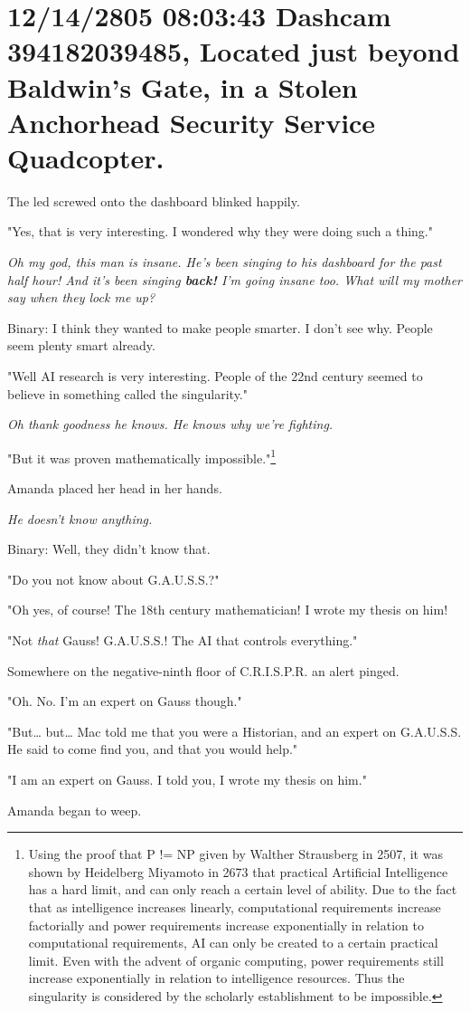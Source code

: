 \documentclass[12pt]{book}
\begin{document}
\section*{12/14/2805 08:03:43 Dashcam 394182039485, Located just beyond Baldwin's Gate, in a Stolen Anchorhead Security Service Quadcopter.}
\label{sec:org665df3d}

The led screwed onto the dashboard blinked happily.

"Yes, that is very interesting. I wondered why they were doing such a thing."

\emph{Oh my god, this man is insane. He's been singing to his dashboard for the past half hour! And it's been singing \textbf{back!} I'm going insane too. What will my mother say when they lock me up?}

Binary: I think they wanted to make people smarter. I don't see why. People seem plenty smart already.

"Well AI research is very interesting. People of the 22nd century seemed to believe in something called the singularity."

\emph{Oh thank goodness he knows. He knows why we're fighting.}

"But it was proven mathematically impossible."\footnote{Using the proof that P != NP given by Walther Strausberg in 2507, it was shown by Heidelberg Miyamoto in 2673 that practical Artificial Intelligence has a hard limit, and can only reach a certain level of ability. Due to the fact that as intelligence increases linearly, computational requirements increase factorially and power requirements increase exponentially in relation to computational requirements, AI can only be created to a certain practical limit. Even with the advent of organic computing, power requirements still increase exponentially in relation to intelligence resources. Thus the singularity is considered by the scholarly establishment to be impossible.}

Amanda placed her head in her hands.

\emph{He doesn't know anything.}

Binary: Well, they didn't know that.

"Do you not know about G.A.U.S.S.?"

"Oh yes, of course! The 18th century mathematician! I wrote my thesis on him!

"Not \emph{that} Gauss! G.A.U.S.S.! The AI that controls everything."

Somewhere on the negative-ninth floor of C.R.I.S.P.R. an alert pinged.

"Oh. No. I'm an expert on Gauss though."

"But\ldots{} but\ldots{} Mac told me that you were a Historian, and an expert on G.A.U.S.S. He said to come find you, and that you would help."

"I am an expert on Gauss. I told you, I wrote my thesis on him."

Amanda began to weep.
\end{document}
